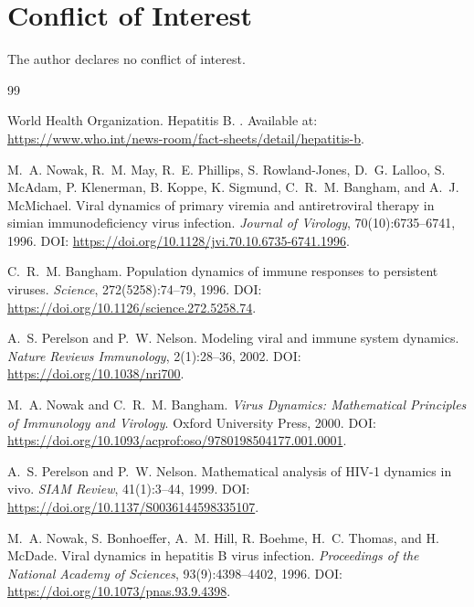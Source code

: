 \documentclass{article}
\begin{document}
\section*{Conflict of Interest}

The author declares no conflict of interest.


\begin{thebibliography}{99}
\setlength{\itemsep}{0pt}

World Health Organization.
\newblock Hepatitis B.
. Available at: \url{https://www.who.int/news-room/fact-sheets/detail/hepatitis-b}.

M.~A. Nowak, R.~M. May, R.~E. Phillips, S. Rowland-Jones, D.~G. Lalloo, S. McAdam, P. Klenerman, B. Koppe, K. Sigmund, C.~R.~M. Bangham, and A.~J. McMichael.
\newblock Viral dynamics of primary viremia and antiretroviral therapy in simian immunodeficiency virus infection.
\newblock \emph{Journal of Virology}, 70(10):6735--6741, 1996. DOI: \url{https://doi.org/10.1128/jvi.70.10.6735-6741.1996}.

C.~R.~M. Bangham.
\newblock Population dynamics of immune responses to persistent viruses.
\newblock \emph{Science}, 272(5258):74--79, 1996. DOI: \url{https://doi.org/10.1126/science.272.5258.74}.

A.~S. Perelson and P.~W. Nelson.
\newblock Modeling viral and immune system dynamics.
\newblock \emph{Nature Reviews Immunology}, 2(1):28--36, 2002. DOI: \url{https://doi.org/10.1038/nri700}.

M.~A. Nowak and C.~R.~M. Bangham.
\newblock \emph{Virus Dynamics: Mathematical Principles of Immunology and Virology}.
\newblock Oxford University Press, 2000. DOI: \url{https://doi.org/10.1093/acprof:oso/9780198504177.001.0001}.

A.~S. Perelson and P.~W. Nelson.
\newblock Mathematical analysis of HIV-1 dynamics in vivo.
\newblock \emph{SIAM Review}, 41(1):3--44, 1999. DOI: \url{https://doi.org/10.1137/S0036144598335107}.

M.~A. Nowak, S. Bonhoeffer, A.~M. Hill, R. Boehme, H.~C. Thomas, and H. McDade.
\newblock Viral dynamics in hepatitis B virus infection.
\newblock \emph{Proceedings of the National Academy of Sciences}, 93(9):4398--4402, 1996. DOI: \url{https://doi.org/10.1073/pnas.93.9.4398}.


\end{thebibliography}
\end{document}
